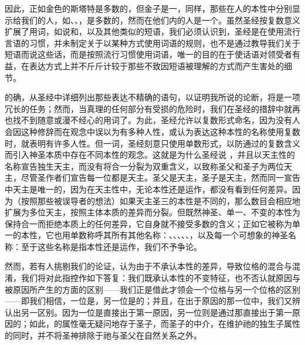 因此，正如金色的斯塔特是多数的，但金子是一，同样，那些在人的本性中分别显示给我们的人，如、、，是多数的，然而在他们内的人是一个。虽然圣经按复数意义扩展了用词，如说和，以及其他类似的短语，我们必须认识到，圣经是在使用流行言语的习惯，并未制定关于以某种方式使用词语的规则，也不是通过教导我们关于短语而说这些话，而是按照流行习惯使用词语，唯一的目的在于使话语对领受者有益，在表达方式上并不斤斤计较于那些不致因短语被理解的方式而产生害处的细节。\par

的确，从圣经中详细列出那些表达不精确的语句，以证明我所说的论断，将是一项冗长的任务；然而，当真理的任何部分有受损的危险时，我们在圣经的措辞中就再也找不到随意或漫不经心的用词了。为此，圣经允许以复数形式命名，因为没有人会因这种修辞而在观念中误以为有多种人性，或认为表达这种本性的名称使用复数时，就表明有许多人性。但一词，圣经刻意只使用单数形式，以防通过的复数含义而引入神圣本质中存在不同本性的观念。这就是为什么圣经说 ，并且以天主性的名称宣告独生天主，而没有将合一分裂为双重含义，以致称圣父和圣子为两位天主，尽管圣作者们宣告每一位都是天主。圣父是天主，圣子是天主，然而同一宣告中天主是唯一的，因为在天主性中，无论本性还是运作，都没有看到任何差异。因为（按照那些被误导者的想法）如果天主圣三的本性是不同的，那么数目会相应地扩展为多位天主，按照主体本质的差异而分裂。但既然神圣、单一、不变的本性为保持合一而拒绝本质上的任何差异，它自身就不接受多数的含义；正如它被称为单一的本性，它也用单数称呼其所有其他名称：、、、、、，以及每一个可想象的神圣名称：至于这些名称是指本性还是运作，我们不予争论。\par

然而，若有人挑剔我们的论证，认为由于不承认本性的差异，导致位格的混合与混淆，我们将对此指控作如下答复：我们既承认本性的不变特征，也不否认就原因与被原因所产生的方面的区别——我们正是借此才领会一个位格与另一个位格的区别——即我们相信，一位是，另一位是的；并且，在出于原因的那一位中，我们又辨认出另一区别。因为一位是直接出于第一原因，另一位则是通过那直接出于第一原因的；如此，的属性毫无疑问地存于圣子，而圣子的中介，在维护祂的独生子属性的同时，并不将圣神排除于祂与圣父在自然关系之外。\par


